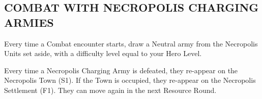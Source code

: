 \begin{multicols*}{2}
\subsection*{\MakeUppercase{Combat with Necropolis Charging Armies}}


Every time a Combat encounter starts, draw a Neutral army from the Necropolis Units set aside, with a difficulty level equal to your Hero Level.


Every time a Necropolis Charging Army is defeated, they re-appear on the Necropolis Town (S1).
If the Town is occupied, they re-appear on the Necropolis Settlement (F1).
They can move again in the next Resource Round.



\end{multicols*}


